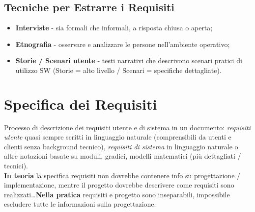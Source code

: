 \documentclass{article}
\begin{document}
    \subsection{Tecniche per Estrarre i Requisiti}
      \begin{itemize}
        \item \textbf{Interviste} - sia formali che informali, a risposta chiusa o aperta;
        \item \textbf{Etnografia} - osservare e analizzare le persone nell'ambiente operativo;
        \item \textbf{Storie / Scenari utente} - testi narrativi che descrivono scenari pratici di utilizzo SW (Storie = alto livello / Scenari = specifiche dettagliate).
      \end{itemize}
  \section{Specifica dei Requisiti}
    Processo di descrizione dei requisiti utente e di sistema in un documento: \textit{requisiti utente} quasi sempre scritti in linguaggio naturale (comprensibili da utenti e clienti senza background tecnico), \textit{requisiti di sistema} in linguaggio naturale o altre notazioni basate su moduli, gradici, modelli matematici (più dettagliati / tecnici). \\ \textbf{In teoria} la specifica requisiti non dovrebbe contenere info su progettazione / implementazione, mentre il progetto dovrebbe descrivere come requisiti sono realizzati\dots \textbf{Nella pratica} requisiti e progetto sono inseparabili, impossibile escludere tutte le informazioni sulla progettazione. 
\end{document}
